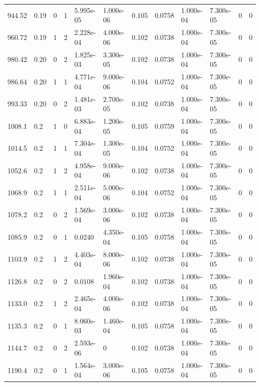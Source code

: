 \documentclass[preview]{standalone}
\begin{document}
{{{\begin{tabular}{L{1.2cm}C{1.2cm} C{0.3cm}C{0.5cm} C{1.4cm}C{1.4cm} C{1.4cm}C{1.4cm} C{1.6cm}C{1.6cm} C{1.6cm}C{1.6cm}}
  944.52  &  0.19  & 0     &  1 &  5.995e-05  & 1.000e-06  &  0.105&   0.0758& 1.000e-04 & 7.300e-05   &  0 & 0  \\ 
  960.72  &  0.19  & 1     &  2 &  2.228e-04  & 4.000e-06  &  0.102&   0.0738& 1.000e-04 & 7.300e-05   &  0 & 0  \\ 
  980.42  &  0.20  & 0     &  2 &  1.825e-03  & 3.300e-05  &  0.102&   0.0738& 1.000e-04 & 7.300e-05   &  0 & 0  \\ 
  986.64  &  0.20  & 1     &  1 &  4.771e-04  & 9.000e-06  &  0.104&   0.0752& 1.000e-04 & 7.300e-05   &  0 & 0  \\ 
  993.33  &  0.20  & 0     &  2 &  1.481e-03  & 2.700e-05  &  0.102&   0.0738& 1.000e-04 & 7.300e-05   &  0 & 0  \\ 
  1008.1  &   0.2  & 1     &  0 &  6.883e-04  & 1.200e-05  &  0.105&   0.0759& 1.000e-04 & 7.300e-05   &  0 & 0  \\ 
  1014.5  &   0.2  & 1     &  1 &  7.304e-04  & 1.300e-05  &  0.104&   0.0752& 1.000e-04 & 7.300e-05   &  0 & 0  \\ 
  1052.6  &   0.2  & 1     &  2 &  4.958e-04  & 9.000e-06  &  0.102&   0.0738& 1.000e-04 & 7.300e-05   &  0 & 0  \\ 
  1068.9  &   0.2  & 1     &  1 &  2.511e-04  & 5.000e-06  &  0.104&   0.0752& 1.000e-04 & 7.300e-05   &  0 & 0  \\ 
  1078.2  &   0.2  & 0     &  2 &  1.569e-04  & 3.000e-06  &  0.102&   0.0738& 1.000e-04 & 7.300e-05   &  0 & 0  \\ 
  1085.9  &   0.2  & 0     &  1 &  0.0240  & 4.350e-04  &  0.105&   0.0758& 1.000e-04 & 7.300e-05   &  0 & 0  \\ 
  1103.9  &   0.2  & 1     &  2 &  4.403e-04  & 8.000e-06  &  0.102&   0.0738& 1.000e-04 & 7.300e-05   &  0 & 0  \\ 
  1126.8  &   0.2  & 0     &  2 &  0.0108  & 1.960e-04  &  0.102&   0.0738& 1.000e-04 & 7.300e-05   &  0 & 0  \\ 
  1133.0  &   0.2  & 1     &  2 &  2.465e-04  & 4.000e-06  &  0.102&   0.0738& 1.000e-04 & 7.300e-05   &  0 & 0  \\ 
  1135.3  &   0.2  & 0     &  1 &  8.060e-03  & 1.460e-04  &  0.105&   0.0758& 1.000e-04 & 7.300e-05   &  0 & 0  \\ 
  1144.7  &   0.2  & 0     &  2 &  2.593e-06  & 0  &  0.102&   0.0738& 1.000e-04 & 7.300e-05   &  0 & 0  \\ 
  1190.4  &   0.2  & 0     &  1 &  1.564e-04  & 3.000e-06  &  0.105&   0.0758& 1.000e-04 & 7.300e-05   &  0 & 0  \\ 

\end{tabular}}}}
\end{document}
